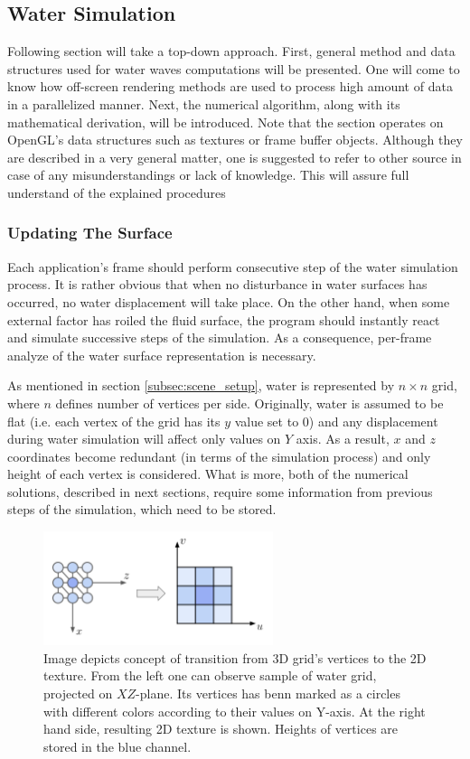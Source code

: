 \documentclass{report}
\begin{document}
\subsection{Water Simulation} \label{subsec:water_simulation}
Following section will take a top-down approach. First, general method and data structures used for water waves computations will be presented. One will come to know how off-screen rendering methods are used to process high amount of data in a parallelized manner. Next, the numerical algorithm, along with its mathematical derivation, will be introduced. Note that the section operates on OpenGL's data structures such as textures or frame buffer objects. Although they are described in a very general matter, one is suggested to refer to other source in case of any misunderstandings or lack of knowledge. This will assure full understand of the explained procedures

\subsubsection{Updating The Surface}
Each application's frame should perform consecutive step of the water simulation process. It is rather obvious that when no disturbance in water surfaces has occurred, no water displacement will take place. On the other hand, when some external factor has roiled the fluid surface, the program should instantly react and simulate successive steps of the simulation. As a consequence, per-frame analyze of the water surface representation is necessary. 

As mentioned in section \ref{subsec:scene_setup}, water is represented by $n \times n$ grid, where $n$ defines number of vertices per side. Originally, water is assumed to be flat (i.e. each vertex of the grid has its $y$ value set to $0$) and any displacement during water simulation will affect only values on $Y$ axis. As a result, $x$ and $z$ coordinates become redundant (in terms of the simulation process) and only height of each vertex is considered. What is more, both of the numerical solutions, described in next sections, require some information from previous steps of the simulation, which need to be stored.

\begin{figure}[H]
    \centering
    \includegraphics[width=0.6\textwidth]{images/grid_to_tex.pdf}
    \caption{Image depicts concept of transition from 3D grid's vertices to the 2D texture. From the left one can observe sample of water grid, projected on $XZ$-plane. Its vertices has benn marked as a circles with different colors according to their values on Y-axis. At the right hand side, resulting 2D texture is shown. Heights of vertices are stored in the blue channel.}
    \label{fig:grid_to_tex}
\end{figure}
\end{document}
